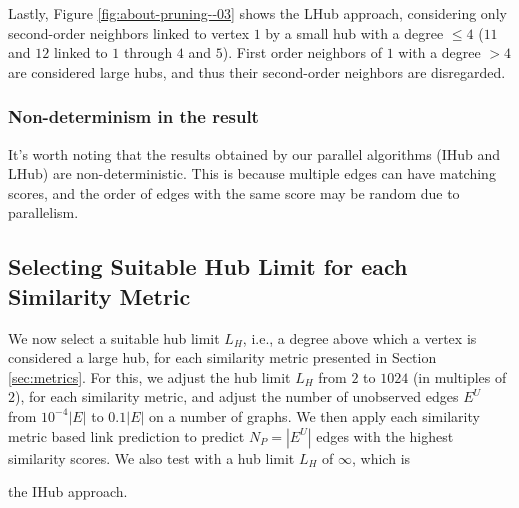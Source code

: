 Lastly, Figure \ref{fig:about-pruning--03} shows the LHub approach, considering only second-order neighbors linked to vertex $1$ by a small hub with a degree $\leq 4$ ($11$ and $12$ linked to $1$ through $4$ and $5$). First order neighbors of $1$ with a degree $> 4$ are considered large hubs, and thus their second-order neighbors are disregarded.


\subsubsection{Non-determinism in the result}

It's worth noting that the results obtained by our parallel algorithms (IHub and LHub) are non-deterministic. This is because multiple edges can have matching scores, and the order of edges with the same score may be random due to parallelism.




\subsection{Selecting Suitable Hub Limit for each Similarity Metric}
\label{sec:select-limit}

We now select a suitable hub limit $L_H$, i.e., a degree above which a vertex is considered a large hub, for each similarity metric presented in Section \ref{sec:metrics}. For this, we adjust the hub limit $L_H$ from $2$ to $1024$ (in multiples of $2$), for each similarity metric, and adjust the number of unobserved edges $E^U$ from $10^{-4}|E|$ to $0.1|E|$ on a number of graphs. We then apply each similarity metric based link prediction to predict $N_P = |E^U|$ edges with the highest similarity scores. We also test with a hub limit $L_H$ of $\infty$, which is the IHub approach.

